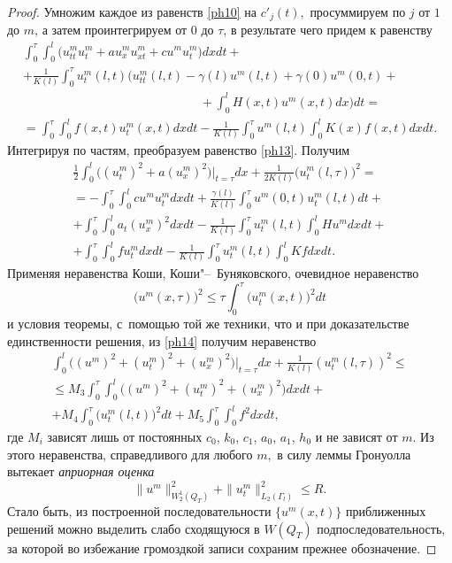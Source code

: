 \begin{proof}
Умножим каждое из равенств \eqref{ph10} на $c'_j(t),$ просуммируем по $j$ от $1$ до  $m$, а затем проинтегрируем от $0$ до $\tau$, в результате чего придем к равенству
\begin{multline}
\int _0^{\tau} \int _0^l \bigl(u^m_{tt}u^m_t+ au^m_xu^m_{xt}
+cu^mu_t^m \bigr)dxdt+
\\
+\frac{1}{K(l)} \int _0^{\tau}u_t^m(l,t)
\biggl (u^m_{tt} (l,t)-\gamma(l)u^m(l,t)+
\gamma(0)u^m(0,t)+ \\ \hspace{6cm} +
 \int _0^lH(x,t)u^m(x,t)dx \biggr)dt=
\\
\label{ph13}
=  \int _0^{\tau} \int _0^lf(x,t)u_t^m(x,t)dxdt-
\frac{1}{K(l)} \int _0^{\tau}u^m(l,t)
 \int _0^lK(x)f(x,t)dxdt.
\end{multline}
Интегрируя по частям, преобразуем равенство \eqref{ph13}. 
Получим
\begin{multline}
\frac{1}{2} \int _0^l \bigl((u^m_t)^2+a(u^m_x)^2\bigr)\bigr|_{t=\tau}dx+
\frac{1}{2K(l)} \bigl(u_t^m(l,\tau)\bigr)^2=
\\
=
- \int _0^{\tau} \int _0^lcu^mu^m_tdxdt
+\frac{\gamma(l)}{K(l)} \int _0^{\tau}u^m(0,t)u^m_t(l,t)dt+ \\
+
  \int _0^{\tau} \int _0^la_t(u^m_x)^2dxdt
-\frac{1}{K(l)} \int _0^{\tau}u^m_t(l,t) \int _0^lHu^mdxdt+
\\
 \label{ph14}
+ \int _0^{\tau} \int _0^lfu^m_tdxdt-
\frac{1}{K(l)} \int _0^{\tau}u^m_t(l,t) \int _0^lKfdxdt.
\end{multline}
Применяя неравенства Коши, Коши"--~Буняковского, очевидное неравенство
$$
\bigl(u^m(x,\tau)\bigr)^2\leq \tau  \int _0^{\tau} \bigl(u^m_t(x,t)\bigr)^2dt$$ и условия теоремы,  с~помощью той же техники, что и при доказательстве единственности решения, из \eqref{ph14} получим  неравенство
\begin{multline}
 \int _0^l \bigl((u^m)^2+(u^m_t)^2+(u^m_x)^2\bigr)\bigr|_{t=\tau}dx+
\frac{1}{K(l)}(u^m_t(l,\tau))^2\leq 
\\
 \label{ph15}
\leq M_3 \int _0^{\tau} \int _0^l\bigl((u^m)^2+(u^m_t)^2+(u_x^m)^2\bigr)dxdt+
\\
+
M_4 \int _0^{\tau} \bigl(u^m_t(l,t)\bigr)^2dt
+ M_5 \int _0^{\tau} \int _0^lf^2dxdt,
\end{multline}
где $M_i$ зависят лишь от постоянных $ c_0$, $k_0$, $c_1$, $a_0$, $a_1$, $h_0 $ и не зависят от $m.$
Из этого неравенства, справедливого для любого $m,$ в силу леммы Гронуолла вытекает {\it  априорная оценка}
\begin{equation}
 \label{ph16}
\|u^m\|^2_{W_2^1(Q_T)}+\|u^m_t\|^2_{L_2(\Gamma_l)}\leq R.
\end{equation}
 Стало быть, из построенной последовательности $\{u^m(x,t)\}$ приближенных решений можно выделить слабо
сходящуюся в $W(Q_T)$ подпоследовательность, за которой во избежание громоздкой записи сохраним прежнее обозначение.


\end{proof}
